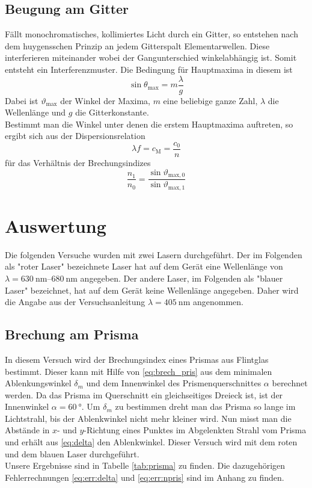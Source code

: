 \subsection{Beugung am Gitter}
Fällt monochromatisches, kollimiertes Licht durch ein Gitter, so entstehen nach dem huygensschen Prinzip an jedem Gitterspalt Elementarwellen. Diese interferieren miteinander wobei der Gangunterschied winkelabhängig ist. Somit entsteht ein Interferenzmuster. Die Bedingung für Hauptmaxima in diesem ist
\begin{equation}
	\sin \theta_\mathrm{max} = m \frac{\lambda}{g}
\end{equation}
Dabei ist $ \vartheta_\mathrm{max} $ der Winkel der Maxima, $ m $ eine beliebige ganze Zahl, $ \lambda $ die Wellenlänge und $ g $ die Gitterkonstante.\\
Bestimmt man die Winkel unter denen die erstem Hauptmaxima auftreten, so ergibt sich aus der Dispersionsrelation 
\begin{equation}
	\lambda f = c_\mathrm M = \frac{c_0}{n}
\end{equation}
für das Verhältnis der Brechungsindizes
\begin{equation}
	\frac{n_1}{n_0} = \frac{\sin \vartheta_{\mathrm{max},0}}{\sin\vartheta_{\mathrm{max}, 1}} \label{eq:brech_wasser}
\end{equation}
\newpage
\section{Auswertung}
Die folgenden Versuche wurden mit zwei Lasern durchgeführt. Der im Folgenden als "roter Laser" bezeichnete Laser hat auf dem Gerät eine Wellenlänge von $\lambda = \SIrange{630}{680}{\nano\meter} $ angegeben. Der andere Laser, im Folgenden als "blauer Laser" bezeichnet, hat auf dem Gerät keine Wellenlänge angegeben. Daher wird die Angabe aus der Versuchsanleitung \cite[9]{anleitung2015} $ \lambda = \SI{405}{\nano\meter} $ angenommen.
\subsection{Brechung am Prisma}
In diesem Versuch wird der Brechungsindex eines Prismas aus Flintglas bestimmt. Dieser kann mit Hilfe von \eqref{eq:brech_pris} aus dem minimalen Ablenkungswinkel $ \delta_m $ und dem Innenwinkel des Prismenquerschnittes $ \alpha $ berechnet werden. Da das Prisma im Querschnitt ein gleichseitiges Dreieck ist, ist der Innenwinkel $ \alpha = \SI{60}{\degree} $. Um $ \delta_m $ zu bestimmen dreht man das Prisma so lange im Lichtstrahl, bis der Ablenkwinkel nicht mehr kleiner wird. Nun misst man die Abstände in $ x $- und $ y $-Richtung eines Punktes im Abgelenkten Strahl vom Prisma und erhält aus \eqref{eq:delta} den Ablenkwinkel. Dieser Versuch wird mit dem roten und dem blauen Laser durchgeführt. \\
Unsere Ergebnisse sind in Tabelle \ref{tab:prisma} zu finden. Die dazugehörigen Fehlerrechnungen \eqref{eq:err:delta} und \eqref{eq:err:npris} sind im Anhang zu finden.

